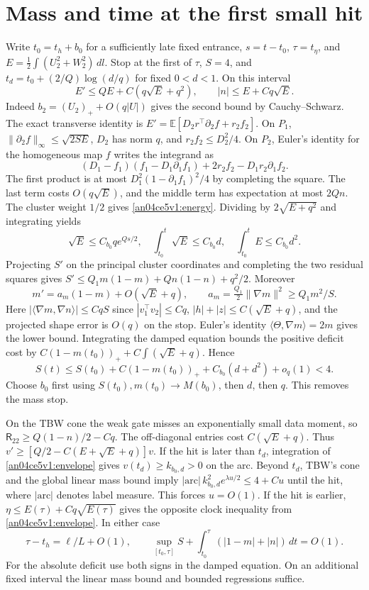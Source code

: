 \documentclass[11pt]{article}
\newcommand{\dd}{\,dl}
\newcommand{\dt}{\,dt}
\newcommand{\E}{\mathbb E}
\begin{document}
\section{Mass and time at the first small hit}\label{an04ce5v1:mass}
Write $t_0=t_h+b_0$ for a sufficiently late fixed entrance, $s=t-t_0$,
$\tau=t_\eta$, and $E=\tfrac12\int (U_2^2+W_2^2)\dd$. Stop at the first of
$\tau$, $S=4$, and $t_d=t_0+(2/Q)\log(d/q)$ for fixed $0<d<1$.
On this interval
\begin{equation}\label{an04ce5v1:energy}
 E'\le QE+C(q\sqrt E+q^2),\qquad |n|\le E+Cq\sqrt E .
\end{equation}
Indeed $b_2=(U_2)_++O(q|U|)$ gives the second bound by Cauchy--Schwarz.
The exact transverse identity is $E'=\E[D_2r^\top\partial_2 f+r_2 f_2]$.
On $P_1$, $\|\partial_2 f\|_\infty\le\sqrt{2SE}$, $D_2$ has norm $q$, and $r_2 f_2\le D_2^2/4$. On $P_2$, Euler's identity for the homogeneous map $f$ writes the integrand as
\[
 (D_1-f_1)(f_1-D_1\partial_1 f_1)+2r_2 f_2-D_1r_2\partial_1 f_2.
\]
The first product is at most $D_1^2(1-\partial_1 f_1)^2/4$ by completing the square. The last term costs $O(q\sqrt E)$, and the middle term has expectation at most $2Qn$. The cluster weight $1/2$ gives \eqref{an04ce5v1:energy}. Dividing by $2\sqrt{E+q^2}$ and integrating yields
\begin{equation}\label{an04ce5v1:envelope}
 \sqrt E\le C_{b_0}q e^{Qs/2},\quad
 \int_{t_0}^t\sqrt E\le C_{b_0}d,\quad \int_{t_0}^t E\le C_{b_0}d^2 .
\end{equation}
Projecting $S'$ on the principal cluster coordinates and completing the two residual squares gives $S'\le Q_1m(1-m)+Qn(1-n)+q^2/2$. Moreover
\[
 m'=a_m(1-m)+O(\sqrt E+q),\qquad
 a_m=\tfrac{Q_1}2\|\nabla m\|^2\ge Q_1m^2/S.
\]
Here $|\langle\nabla m,\nabla n\rangle|\le Cq S$ since $|v_1^\top v_2|\le Cq$, $|h|+|z|\le C(\sqrt E+q)$, and the projected shape error is $O(q)$ on the stop. Euler's identity $\langle\Theta,\nabla m\rangle=2m$ gives the lower bound. Integrating the damped equation bounds the positive deficit cost by $C(1-m(t_0))_++C\int(\sqrt E+q)$. Hence
\[
 S(t)\le S(t_0)+C(1-m(t_0))_++C_{b_0}(d+d^2)+o_q(1)<4 .
\]
Choose $b_0$ first using $S(t_0),m(t_0)\to M(b_0)$, then $d$, then $q$. This removes the mass stop.

On the TBW cone the weak gate misses an exponentially small data moment, so $\mathsf R_{22}\ge Q(1-n)/2-Cq$. The off-diagonal entries cost $C(\sqrt E+q)$. Thus $v'\ge[Q/2-C(E+\sqrt E+q)]v$. If the hit is later than $t_d$, integration of \eqref{an04ce5v1:envelope} gives $v(t_d)\ge k_{b_0,d}>0$ on the arc. Beyond $t_d$, TBW's cone and the global linear mass bound imply $|\mathrm{arc}|\, k_{b_0,d}^2 e^{\lambda u/2}\le4+Cu$ until the hit, where $|\mathrm{arc}|$ denotes label measure. This forces $u=O(1)$. If the hit is earlier, $\eta\le E(\tau)+Cq\sqrt{E(\tau)}$ gives the opposite clock inequality from \eqref{an04ce5v1:envelope}. In either case
\begin{equation}\label{an04ce5v1:smallhit}
 \tau-t_h=\ell/L+O(1),\qquad
 \sup_{[t_0,\tau]}S+\int_{t_0}^{\tau}(|1-m|+|n|)\dt=O(1).
\end{equation}
For the absolute deficit use both signs in the damped equation. On an additional fixed interval the linear mass bound and bounded regressions suffice.
\end{document}
